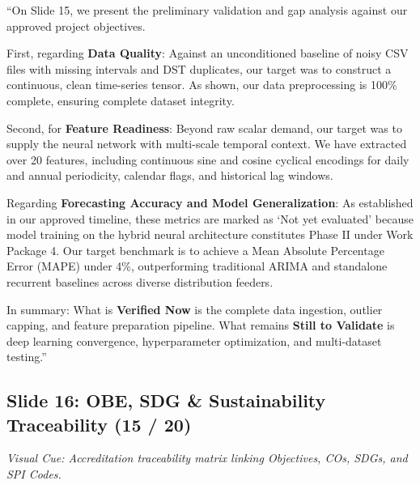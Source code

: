 \documentclass[11pt,a4paper]{article}
\begin{document}
\begin{scriptbox}
``On Slide 15, we present the preliminary validation and gap analysis against our approved project objectives.

First, regarding \textbf{Data Quality}: Against an unconditioned baseline of noisy CSV files with missing intervals and DST duplicates, our target was to construct a continuous, clean time-series tensor. As shown, our data preprocessing is 100\% complete, ensuring complete dataset integrity.

Second, for \textbf{Feature Readiness}: Beyond raw scalar demand, our target was to supply the neural network with multi-scale temporal context. We have extracted over 20 features, including continuous sine and cosine cyclical encodings for daily and annual periodicity, calendar flags, and historical lag windows.

Regarding \textbf{Forecasting Accuracy and Model Generalization}: As established in our approved timeline, these metrics are marked as `Not yet evaluated' because model training on the hybrid neural architecture constitutes Phase II under Work Package 4. Our target benchmark is to achieve a Mean Absolute Percentage Error (MAPE) under 4\%, outperforming traditional ARIMA and standalone recurrent baselines across diverse distribution feeders.

In summary: What is \textbf{Verified Now} is the complete data ingestion, outlier capping, and feature preparation pipeline. What remains \textbf{Still to Validate} is deep learning convergence, hyperparameter optimization, and multi-dataset testing.''
\end{scriptbox}

\subsection{Slide 16: OBE, SDG \& Sustainability Traceability (15 / 20)}
\textit{Visual Cue: Accreditation traceability matrix linking Objectives, COs, SDGs, and SPI Codes.}
\end{document}
